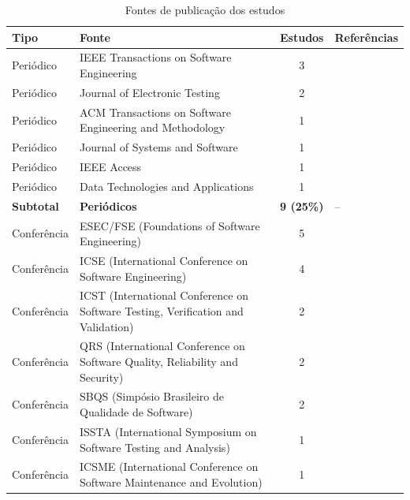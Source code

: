 \begin{table}[H]
    \centering
    \scriptsize
    \caption{Fontes de publicação dos estudos}
    \label{tab:fontes-publicacao}
    \begin{tabular}{|p{2.3cm}|p{5.5cm}|c|p{4.7cm}|}
        \hline
        \textbf{Tipo} & \textbf{Fonte} & \textbf{Estudos} & \textbf{Referências} \\
        \hline
        Periódico & IEEE Transactions on Software Engineering & 3 & \cite{zhang2019, zhang2022, guizzo2022} \\
        \hline
        Periódico & Journal of Electronic Testing & 2 & \cite{arasteh2022, arasteh2023} \\
        \hline
        Periódico & ACM Transactions on Software Engineering and Methodology & 1 & \cite{khanfir2023} \\
        \hline
        Periódico & Journal of Systems and Software & 1 & \cite{tao2025} \\
        \hline
        Periódico & IEEE Access & 1 & \cite{lin2018} \\
        \hline
        Periódico & Data Technologies and Applications & 1 & \cite{shomali2020} \\
        \hline
        \textbf{Subtotal} & \textbf{Periódicos} & \textbf{9 (25\%)} & -- \\
        \hline
        Conferência & ESEC/FSE (Foundations of Software Engineering) & 5 & \cite{inozemtseva2013, just2014, kurtz2016, ahmed2016, ojdanic2023} \\
        \hline
        Conferência & ICSE (International Conference on Software Engineering) & 4 & \cite{zhang2010, yao2014, tufano2020, petrovic2021} \\
        \hline
        Conferência & ICST (International Conference on Software Testing, Verification and Validation) & 2 & \cite{nica2011, just2012} \\
        \hline
        Conferência & QRS (International Conference on Software Quality, Reliability and Security) & 2 & \cite{ashong2025a, ashong2025b} \\
        \hline
        Conferência & SBQS (Simpósio Brasileiro de Qualidade de Software) & 2 & \cite{kuroishi2020, guerino2024} \\
        \hline
        Conferência & ISSTA (International Symposium on Software Testing and Analysis) & 1 & \cite{grano2019} \\
        \hline
        Conferência & ICSME (International Conference on Software Maintenance and Evolution) & 1 & \cite{yandrapally2021} \\

\end{tabular}
\end{table}
